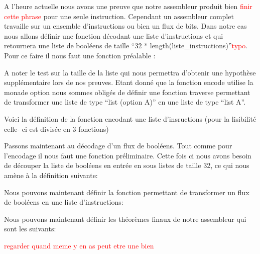 \documentclass {article}
\newcommand{\codefrom}[3]
           {}
\theoremstyle{definition}
\theoremstyle{remark}
\newcommand{\todo}[1]{\textcolor{red}{#1}}
\begin{document}
A l'heure actuelle nous avons une preuve que notre assembleur produit bien \todo{finir cette phrase}
pour une seule instruction. Cependant un assembleur complet travaille sur un ensemble d'instructions
ou bien un flux de bits. Dans notre cas nous allons définir une fonction décodant une liste d'instructions et qui
retournera une liste de booléens de taille ``32 * length(liste\_instructions)''\todo{typo}.
Pour ce faire il nous faut une fonction préalable :

\codefrom{src}{encode}{concat_listes_32}

A noter le test sur la taille de la liste
qui nous permettra d'obtenir une hypothèse supplémentaire lors de nos preuves.
Etant donné que la fonction encode utilise la monade option nous sommes obligés de définir une fonction
traverse permettant de transformer une liste de type ``list (option A)'' en une liste de type ``list A''.

\codefrom{src}{encode}{traverse}

Voici la définition de la fonction encodant une liste d'insructions (pour la lisibilité celle- ci est
divisée en 3 fonctions)

\codefrom{src}{encode}{encode_flux}

Passons maintenant au décodage d'un flux de booléens. Tout comme pour l'encodage il nous faut
une fonction préliminaire. Cette fois ci nous avons besoin de découper la liste de booléens
en entrée en sous listes de taille 32, ce qui nous amène à la définition suivante:

\codefrom{src}{encode}{cut_32}

Nous pouvons maintenant définir la fonction permettant de transformer un flux de booléens
en une liste d'instructions:

\codefrom{src}{encode}{decode_flux}



Nous pouvons maintenant définir les théorèmes finaux de notre assembleur qui sont les suivants:

\codefrom{src}{encode}{encode_decode_flux_decoup}

\codefrom{src}{encode}{decode_flux_decoup_encode}

\todo{regarder quand meme y en as peut etre une bien}
\end{document}
